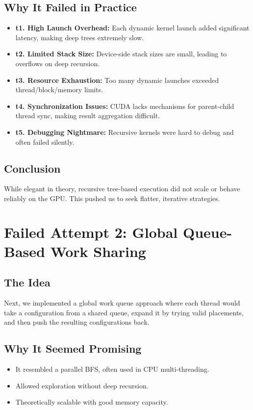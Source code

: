 \documentclass[12pt]{article}
\begin{document}
\subsection*{Why It Failed in Practice}
\begin{itemize}
    \item \textbf{t1. High Launch Overhead:} Each dynamic kernel launch added significant latency, making deep trees extremely slow.
    \item \textbf{t2. Limited Stack Size:} Device-side stack sizes are small, leading to overflows on deep recursion.
    \item \textbf{t3. Resource Exhaustion:} Too many dynamic launches exceeded thread/block/memory limits.
    \item \textbf{t4. Synchronization Issues:} CUDA lacks mechanisms for parent-child thread sync, making result aggregation difficult.
    \item \textbf{t5. Debugging Nightmare:} Recursive kernels were hard to debug and often failed silently.
\end{itemize}

\subsection*{Conclusion}
While elegant in theory, recursive tree-based execution did not scale or behave reliably on the GPU. This pushed us to seek flatter, iterative strategies.

\section*{Failed Attempt 2: Global Queue-Based Work Sharing}

\subsection*{The Idea}
Next, we implemented a global work queue approach where each thread would take a configuration from a shared queue, expand it by trying valid placements, and then push the resulting configurations back.

\subsection*{Why It Seemed Promising}
\begin{itemize}
    \item It resembled a parallel BFS, often used in CPU multi-threading.
    \item Allowed exploration without deep recursion.
    \item Theoretically scalable with good memory capacity.
\end{itemize}
\end{document}
